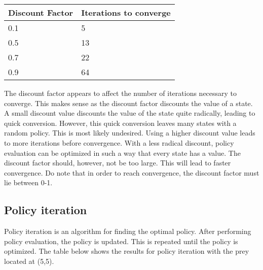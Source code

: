 \documentclass{article}
\begin{document}

\begin{center}
	\begin{tabular}{ l || l }
		Discount Factor & Iterations to converge \\ 
		\hline
		0.1 & 5 \\
		0.5 & 13 \\
		0.7 & 22 \\
		0.9 & 64 \\	
	\end{tabular}
\end{center}

The discount factor appears to affect the number of iterations necessary to converge. This makes sense as the discount factor discounts the value of a state. A small discount value discounts the value of the state quite radically, leading to quick conversion. However, this quick conversion leaves many states with a random policy. This is most likely undesired. Using a higher discount value leads to more iterations before convergence. With a less radical discount, policy evaluation can be optimized in such a way that every state has a value. The discount factor should, however, not be too large. This will lead to faster convergence. Do note that in order to reach convergence, the discount factor must lie between 0-1.

\subsection*{Policy iteration}
Policy iteration is an algorithm for finding the optimal policy. After performing policy evaluation, the policy is updated. This is repeated until the policy is optimized. The table below shows the results for policy iteration with the prey located at (5,5).
\end{document}
